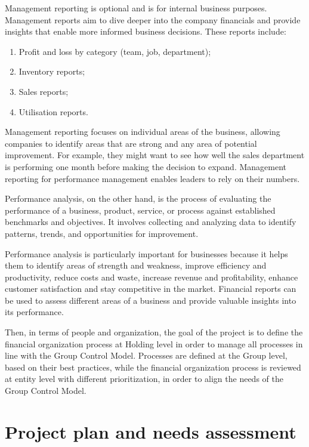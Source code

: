 \documentclass[12pt,a4paper,openright,twoside]{book}
\begin{document}
Management reporting is optional and is for internal business purposes. 
%
Management reports aim to dive deeper into the company financials and provide insights that enable more informed business decisions. 
%
These reports include:

\begin{enumerate}
    \item Profit and loss by category (team, job, department);
    \item Inventory reports;
    \item Sales reports;
    \item Utilisation reports.
\end{enumerate}

Management reporting focuses on individual areas of the business, allowing companies to identify areas that are strong and any area of potential improvement. 
%
For example, they might want to see how well the sales department is performing one month before making the decision to expand. Management reporting for performance management enables leaders to rely on their numbers.

Performance analysis, on the other hand, is the process of evaluating the performance of a business, product, service, or process against established benchmarks and objectives. 
%
It involves collecting and analyzing data to identify patterns, trends, and opportunities for improvement.

Performance analysis is particularly important for businesses because it helps them to identify areas of strength and weakness, improve efficiency and productivity, reduce costs and waste, increase revenue and profitability, enhance customer satisfaction and stay competitive in the market.
%
Financial reports can be used to assess different areas of a business and provide valuable insights into its performance.

Then, in terms of people and organization, the goal of the project is to define the financial organization process at Holding level in order to manage all processes in line with the Group Control Model.
%
Processes are defined at the Group level, based on their best practices, while the financial organization process is reviewed at entity level with different prioritization, in order to align the needs of the Group Control Model.

\section{Project plan and needs assessment}
\end{document}
